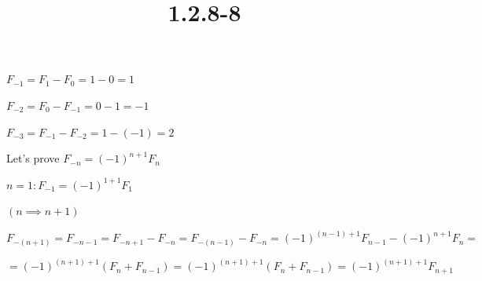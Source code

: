 \documentclass{article}
\title{1.2.8-8}
\begin{document}
\maketitle

\( F_{-1} = F_1 - F_0 = 1-0 = 1 \)

\( F_{-2} = F_0 - F_{-1} = 0-1 = -1 \)

\( F_{-3} = F_{-1} - F_{-2} = 1 - (-1) = 2 \)

Let's prove \( F_{-n} = (-1)^{n+1}F_n \)

\( n = 1: F_{-1} = (-1)^{1+1}F_1 \)

\( (n \implies n + 1) \)

\( F_{-(n+1)} = F_{-n-1} = F_{-n+1} - F_{-n} = F_{-(n-1)} - F_{-n} = (-1)^{(n-1)+1}F_{n-1} - (-1)^{n+1}F_n = \)

\( = (-1)^{(n+1)+1}(F_n + F_{n-1}) = (-1)^{(n+1)+1}(F_n + F_{n-1}) = (-1)^{(n+1)+1} F_{n+1} \)
\end{document}
